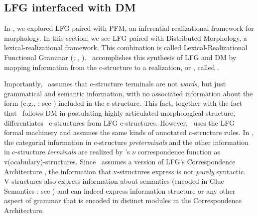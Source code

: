 \documentclass[output=paper,hidelinks]{langscibook}
\begin{document}
\subsection{LFG interfaced with DM}
\label{sec:Morph:lfg-dm}

\begin{sloppypar}
  In , we explored LFG paired with PFM, an
  inferential-realizational framework for morphology. In this section,
  we see LFG paired with Distributed Morphology, a
  lexical-realizational framework. This combination is called
  Lexical-Realizational Functional Grammar (\lrfg;
  \citealt{AsSi16,Melchin2020,everdell:beyond},
  \citealt{asudeh;siddiqi-nd}). \lrfg\ accomplishes this synthesis of
  LFG and DM by mapping
  information from the c-structure to a realization, or
  , called .
\end{sloppypar}

Importantly, \lrfg\ assumes that c-structure terminals are not
\emph{words}, but just grammatical and semantic information, with no
associated information about the form (e.g., ; see
) included in the
c-structure. This fact, together with the fact that \lrfg\ follows DM
in postulating highly articulated morphological structure,
differentiates 
\lrfg\ c-structures from LFG c-structures. However, \lrfg\ uses the
LFG formal machinery and assumes the same kinds of annotated
c-structure rules. In \lrfg, the categorial information in c-structure
\emph{preterminals} and the other information in c-structure \emph{terminals} are realized
by \lrfg's $\nu$ correspondence function as
v(ocabulary)-structures. Since \lrfg\ assumes a version of
LFG's Correspondence Architecture \citep{kapl:89,kaplan1995formal},
the information that v-structures express is not \emph{purely}
syntactic. V-structures also express information about semantics (encoded in Glue Semantics
: see )
and can indeed express 
information structure or any other aspect of grammar that is encoded
in distinct modules in the Correspondence
Architecture. %
\end{document}

